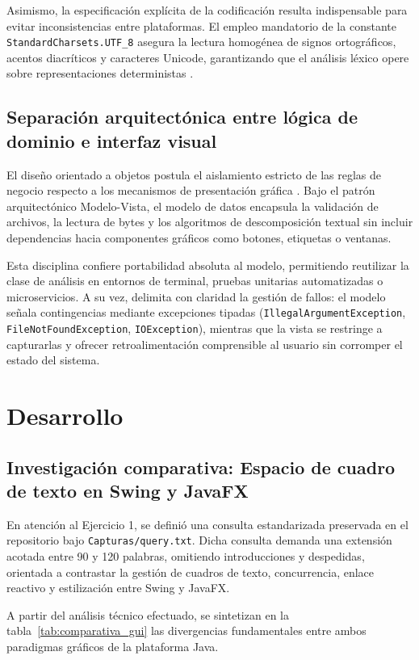 \documentclass[letterpaper,12pt,oneside]{article}
\numberwithin{figure}{section}
\begin{document}
Asimismo, la especificación explícita de la codificación resulta indispensable para evitar inconsistencias entre plataformas. El empleo mandatorio de la constante \texttt{Standard\-Charsets.\-UTF\_8} asegura la lectura homogénea de signos ortográficos, acentos diacríticos y caracteres Unicode, garantizando que el análisis léxico opere sobre representaciones deterministas \cite{gosling2023}.

\subsection{Separación arquitectónica entre lógica de dominio e interfaz visual}
El diseño orientado a objetos postula el aislamiento estricto de las reglas de negocio respecto a los mecanismos de presentación gráfica \cite{bloch2018}. Bajo el patrón arquitectónico Modelo-Vista, el modelo de datos encapsula la validación de archivos, la lectura de bytes y los algoritmos de descomposición textual sin incluir dependencias hacia componentes gráficos como botones, etiquetas o ventanas.

Esta disciplina confiere portabilidad absoluta al modelo, permitiendo reutilizar la clase de análisis en entornos de terminal, pruebas unitarias automatizadas o microservicios. A su vez, delimita con claridad la gestión de fallos: el modelo señala contingencias mediante excepciones tipadas (\texttt{IllegalArgumentException}, \texttt{FileNotFoundException}, \texttt{IOException}), mientras que la vista se restringe a capturarlas y ofrecer retroalimentación comprensible al usuario sin corromper el estado del sistema.

\clearpage
\section{Desarrollo}

\subsection{Investigación comparativa: Espacio de cuadro de texto en Swing y JavaFX}
En atención al Ejercicio 1, se definió una consulta estandarizada preservada en el repositorio bajo \texttt{Capturas/query.txt}. Dicha consulta demanda una extensión acotada entre 90 y 120 palabras, omitiendo introducciones y despedidas, orientada a contrastar la gestión de cuadros de texto, concurrencia, enlace reactivo y estilización entre Swing y JavaFX.

A partir del análisis técnico efectuado, se sintetizan en la tabla~\ref{tab:comparativa_gui} las divergencias fundamentales entre ambos paradigmas gráficos de la plataforma Java.
\end{document}
